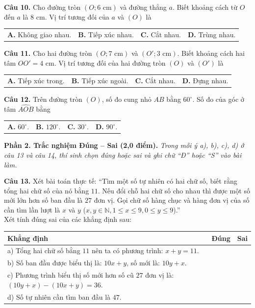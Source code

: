 \documentclass[11pt,a4paper]{article}
\begin{document}
\vspace{1.5mm}
\textbf{Câu 10.} Cho đường tròn $(O; 6\text{ cm})$ và đường thẳng $a$. Biết khoảng cách từ $O$ đến $a$ là $8\text{ cm}$. Vị trí tương đối của $a$ và $(O)$ là\\
\begin{tabularx}{\linewidth}{XXXX}
\textbf{A.} Không giao nhau. & \textbf{B.} Tiếp xúc nhau. & \textbf{C.} Cắt nhau. & \textbf{D.} Trùng nhau.
\end{tabularx}

\vspace{1.5mm}
\textbf{Câu 11.} Cho hai đường tròn $(O; 7\text{ cm})$ và $(O'; 3\text{ cm})$. Biết khoảng cách hai tâm $OO' = 4\text{ cm}$. Vị trí tương đối của hai đường tròn $(O)$ và $(O')$ là\\
\begin{tabularx}{\linewidth}{XXXX}
\textbf{A.} Tiếp xúc trong. & \textbf{B.} Tiếp xúc ngoài. & \textbf{C.} Cắt nhau. & \textbf{D.} Đựng nhau.
\end{tabularx}

\vspace{1.5mm}
\textbf{Câu 12.} Trên đường tròn $(O)$, số đo cung nhỏ $AB$ bằng $60^\circ$. Số đo của góc ở tâm $\widehat{AOB}$ bằng\\
\begin{tabularx}{\linewidth}{XXXX}
\textbf{A.} $60^\circ$. & \textbf{B.} $120^\circ$. & \textbf{C.} $30^\circ$. & \textbf{D.} $90^\circ$.
\end{tabularx}

\vspace{3mm}
\noindent
\textbf{Phần 2. Trắc nghiệm Đúng -- Sai (2,0 điểm).} \textit{Trong mỗi ý a), b), c), d) ở câu 13 và câu 14, thí sinh chọn đúng hoặc sai và ghi chữ ``Đ'' hoặc ``S'' vào bài làm.}

\vspace{1.5mm}
\textbf{Câu 13.} Xét bài toán thực tế: ``Tìm một số tự nhiên có hai chữ số, biết rằng tổng hai chữ số của nó bằng $11$. Nếu đổi chỗ hai chữ số cho nhau thì được một số mới lớn hơn số ban đầu là $27$ đơn vị. Gọi chữ số hàng chục và hàng đơn vị của số cần tìm lần lượt là $x$ và $y$ ($x, y \in \mathbb{N}, 1 \le x \le 9, 0 \le y \le 9$).''\\
Xét tính đúng sai của các khẳng định sau:
\begin{center}
\begin{tabularx}{\linewidth}{|X|c|c|}
\hline
\textbf{Khẳng định} & \textbf{Đúng} & \textbf{Sai} \\
\hline
a) Tổng hai chữ số bằng $11$ nên ta có phương trình: $x + y = 11$. & & \\
\hline
b) Số ban đầu được biểu thị là: $10x + y$, số mới là: $10y + x$. & & \\
\hline
c) Phương trình biểu thị số mới hơn số cũ $27$ đơn vị là: $(10y + x) - (10x + y) = 36$. & & \\
\hline
d) Số tự nhiên cần tìm ban đầu là $47$. & & \\
\hline
\end{tabularx}
\end{center}
\end{document}
